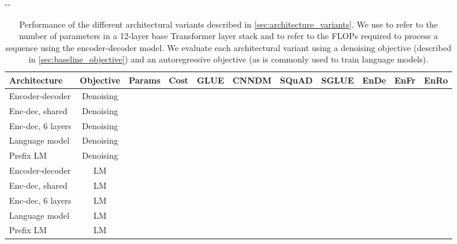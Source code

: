 \documentclass[twoside,11pt]{article}
\newlength{\offsetpage}
\newenvironment{widepage}{\begin{adjustwidth}{-\offsetpage}{-\offsetpage}\addtolength{\textwidth}{2\offsetpage}}{\end{adjustwidth}}
\newcommand{\bsl}{\makebox[0pt][r]{\raisebox{0.05em}{}}}
\begin{document}
\begin{table}
\footnotesize
\begin{widepage}
\centering
\begin{tabular}{l c c c c c c c c c c}
\toprule
    Architecture         & Objective & Params & Cost  & GLUE        & CNNDM       & SQuAD       & SGLUE       & EnDe        & EnFr        & EnRo    \\
\midrule
    \bsl Encoder-decoder & Denoising &    &    &  &  &  &  &  &  &  \\
    Enc-dec, shared      & Denoising &     &    &      &      &  &  &      &      &  \\
    Enc-dec, 6 layers    & Denoising &     &  &      &      &      &      &      &      &  \\
    Language model       & Denoising &     &    &      &      &      &      &      &      &  \\
    Prefix LM            & Denoising &     &    &      &      &      &      &      &      &  \\
\midrule
    Encoder-decoder      & LM        &    &    &      &      &      &      &      &      &  \\
    Enc-dec, shared      & LM        &     &    &      &      &      &      &      &      &  \\
    Enc-dec, 6 layers    & LM        &     &  &      &      &      &      &      &      &  \\
    Language model       & LM        &     &    &      &      &      &      &      &      &  \\
    Prefix LM            & LM        &     &    &      &      &      &      &      &      &  \\
\bottomrule
\end{tabular}
\end{widepage}
\caption{
Performance of the different architectural variants described in \cref{sec:architecture_variants}.
We use  to refer to the number of parameters in a 12-layer base Transformer layer stack and  to refer to the FLOPs required to process a sequence using the encoder-decoder model.
We evaluate each architectural variant using a denoising objective (described in \cref{sec:baseline_objective}) and an autoregressive objective (as is commonly used to train language models).
}
\label{tab:architectures_results}

\end{table}
\end{document}
